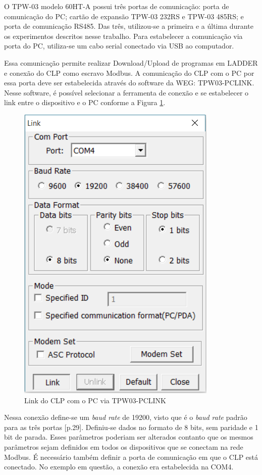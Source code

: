 O TPW-03 modelo 60HT-A possui três portas de comunicação: porta de comunicação do PC; cartão de expansão TPW-03 232RS e TPW-03 485RS; e porta de comunicação RS485. Das três, utilizou-se a primeira e a última durante os experimentos descritos nesse trabalho. Para estabelecer a comunicação via porta do PC, utiliza-se um cabo serial conectado via USB ao computador.

Essa comunicação permite realizar Download/Upload de programas em LADDER e conexão do CLP como escravo Modbus. A comunicação do CLP com o PC por essa porta deve ser estabelecida através do software da WEG: TPW03-PCLINK. Nesse software, é possível selecionar a ferramenta de conexão e se estabelecer o link entre o dispositivo e o PC conforme a Figura \ref{fig:link}.

\begin{figure}[h!]
\centering
\includegraphics[scale=0.7]{link.png}
\caption{Link do CLP com o PC via TPW03-PCLINK}
\label{fig:link}
\end{figure}

Nessa conexão define-se um \textit{baud rate} de 19200, visto que é o \textit{baud rate} padrão para as três portas \cite{weg2010manualinstalacao}[p.29]. Definiu-se dados no formato de 8 bits, sem paridade e 1 bit de parada. Esses parâmetros poderiam ser alterados contanto que os mesmos parâmetros sejam definidos em todos os dispositivos que se conectam na rede Modbus. É necessário também definir a porta de comunicação em que o CLP está conectado. No exemplo em questão, a conexão era estabelecida na COM4.

